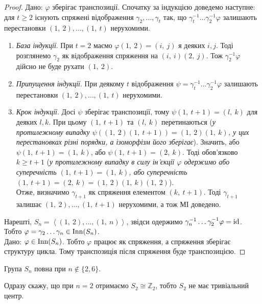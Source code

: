 \documentclass{math_library}
\begin{document}
\begin{proof}
\rightproof Дано: $\varphi$ зберігає транспозиції. Спочатку за індукцією доведемо наступне: для $t \geq 2$ існують спряжені відображення $\gamma_2,\dots,\gamma_t$ так, що $\gamma_t^{-1} \dots \gamma_2^{-1} \varphi$ залишають перестановки $(1,\ 2), \dots , (1,\ t)$ нерухомими.
\begin{enumerate}[wide=0pt,label={\Roman*.}]
\item \textit{База індукції}. При $t = 2$ маємо $\varphi(1,\ 2) = (i,\ j)$ я деяких $i,j$. Тоді розглянемо $\gamma_2$ як відображення спряження на $(i,\ i)(2,\ j)$. Тож $\gamma_2^{-1} \varphi$ дійсно не буде рухати $(1,\ 2)$.

\item \textit{Припущення індукції}. При деякому $t$ відображення $\psi = \gamma_t^{-1} \dots \gamma_2^{-1} \varphi$ залишають перестановки $(1,\ 2), \dots , (1,\ t)$ нерухомими.

\item \textit{Крок індукції}. Досі $\psi$ зберігає транспозиції, тому $\psi(1,\ t+1) = (l,\ k)$ для деяких $l,k$. При цьому $(1,\ t+1)$ та $(l,\ k)$ перетинаються (\textit{у протилежному випадку $\psi((1,\ 2)(1,\ t+1)) = (1,\ 2)(1,\ k)$, у цих перестановках різні порядки, а ізоморфізм його зберігає}). Значить, або $\psi(1,\ t+1) = (1,\ k)$, або $\psi(1,\ t+1) = (2,\ k)$. Тоді обов'язково $k \geq t+1$ (\textit{у протилежному випадку в силу ін'єкції $\varphi$ одержимо або суперечність $(1,\ t+1) = (1,\ k)$, або суперечність $(1,\ t+1) = (2,\ k) = (1,\ 2)(1,\ k)(1,\ 2)$}).\\
Отже, визначимо $\gamma_{t+1}$ як спряження елементом $(k,\ t+1)$. Тоді $\gamma_{t+1}$ залишає $(1,\ 2), \dots, (1,\ t+1)$ нерухомими, а тож МІ доведено.
\end{enumerate}
Нарешті, $S_n = \left< (1,\ 2), \dots, (1,\ n) \right>$, звідси одержимо $\gamma_n^{-1} \dots \gamma_2^{-1} \varphi = \operatorname{id}$. Тобто $\varphi = \gamma_2 \dots \gamma_n \in \operatorname{Inn}(S_n)$.
\bigskip \\
\leftproof Дано: $\varphi \in \operatorname{Inn}(S_n)$. Тобто $\varphi$ працює як спряження, а спряження зберігає структуру цикла. Тому транспозиція після спряження буде транспозицією.
\end{proof}

\begin{theorem}
Група $S_n$ повна при $n \notin \{2,6\}$.
\end{theorem}

Одразу скажу, що при $n = 2$ отримаємо $S_2 \cong \mathbb{Z}_2$, тобто $S_2$ не має тривіальний центр.
\end{document}

